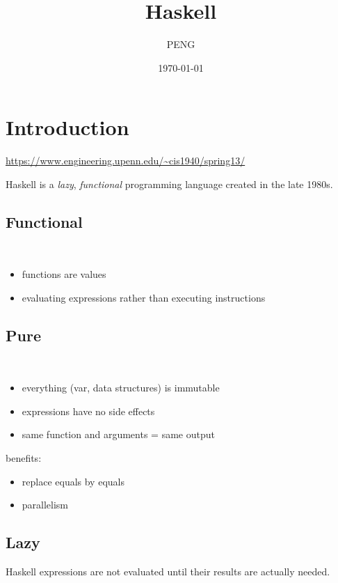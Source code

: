 \documentclass{article}
\title{Haskell}
\author{PENG}
\date{\today}
\begin{document}
\maketitle
\tableofcontents
\section{Introduction}
\url{https://www.engineering.upenn.edu/~cis1940/spring13/}

Haskell is a \textit{lazy}, \textit{functional} programming language created in the late 1980s.

\subsection{Functional}
\begin{definition}[functional]~
    \begin{itemize}
        \item functions are values
        \item evaluating expressions rather than executing instructions
    \end{itemize}
\end{definition}

\subsection{Pure}
\begin{definition}~
    \begin{itemize}
        \item everything (var, data structures) is immutable
        \item expressions have no side effects
        \item same function and arguments = same output
    \end{itemize}
\end{definition}

benefits:
\begin{itemize}
    \item replace equals by equals
    \item parallelism
\end{itemize}

\subsection{Lazy}
\begin{definition}[lazy]
    Haskell expressions are not evaluated until their results are actually needed.
\end{definition}
\end{document}
